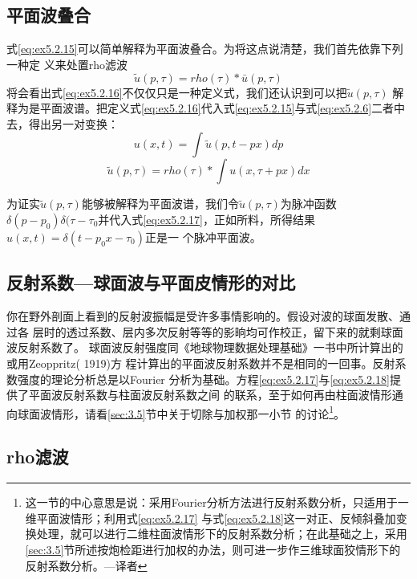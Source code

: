 \subsection{平面波叠合}
\label{sec:5.2.8}

式\ref{eq:ex5.2.15}可以简单解释为平面波叠合。为将这点说清楚，我们首先依靠下列一种定
义来处置rho滤波
\begin{equation}
\tilde{u}(p,\tau)=rho(\tau)*\bar{u}(p,\tau)
\label{eq:ex5.2.16}
\end{equation}
将会看出式\ref{eq:ex5.2.16}不仅仅只是一种定义式，我们还认识到可以把$\tilde{u}(p,\tau)$
解释为是平面波谱。把定义式\ref{eq:ex5.2.16}代入式\ref{eq:ex5.2.15}与式\ref{eq:ex5.2.6}二者中去，得出另一对变换：
\begin{equation}
u(x,t)=\int \tilde{u}(p,t-px)dp
\label{eq:ex5.2.17}
\end{equation}
\begin{equation}
\tilde{u}(p,\tau)=rho(\tau)*\int u(x,\tau+px)dx
\label{eq:ex5.2.18}
\end{equation}

为证实$\tilde{u}(p,\tau)$能够被解释为平面波谱，我们令$\tilde{u}(p,\tau)$为脉冲函数$\delta(p-p_0)
\delta(\tau-\tau_0$并代入式\ref{eq:ex5.2.17}，正如所料，所得结果$u(x,t)=\delta(t-p_0x-\tau_0)$正是一
个脉冲平面波。

\subsection{反射系数---球面波与平面皮情形的对比}
\label{sec:5.2.9}

你在野外剖面上看到的反射波振幅是受许多事情影响的。假设对波的球面发散、通过各
层时的透过系数、层内多次反射等等的影晌均可作校正，留下来的就剩球面波反射系数了。
球面波反射强度同《地球物理数据处理基础》一书中所计算出的或用Zeoppritz(
1919)方
程计算出的平面波反射系数并不是相同的一回事。反射系数强度的理论分析总是以Fourier
分析为基础。方程\ref{eq:ex5.2.17}与\ref{eq:ex5.2.18}提供了平面波反射系数与柱面波反射系数之间
的联系，至于如何再由柱面波情形通向球面波情形，请看\ref{sec:3.5}节中关于切除与加权那一小节
的讨论\footnote{
这一节的中心意思是说：采用Fourier分析方法进行反射系数分析，只适用于一维平面波情形；利用式\ref{eq:ex5.2.17}
与式\ref{eq:ex5.2.18}这一对正、反倾斜叠加变换处理，就可以进行二维柱面波情形下的反射系数分析；在此基础之上，采用
\ref{sec:3.5}节所述按炮检距进行加权的办法，则可进一步作三维球面狡情形下的反射系数分析。---译者
}。

\subsection{rho滤波}
\label{sec:5.2.10}

